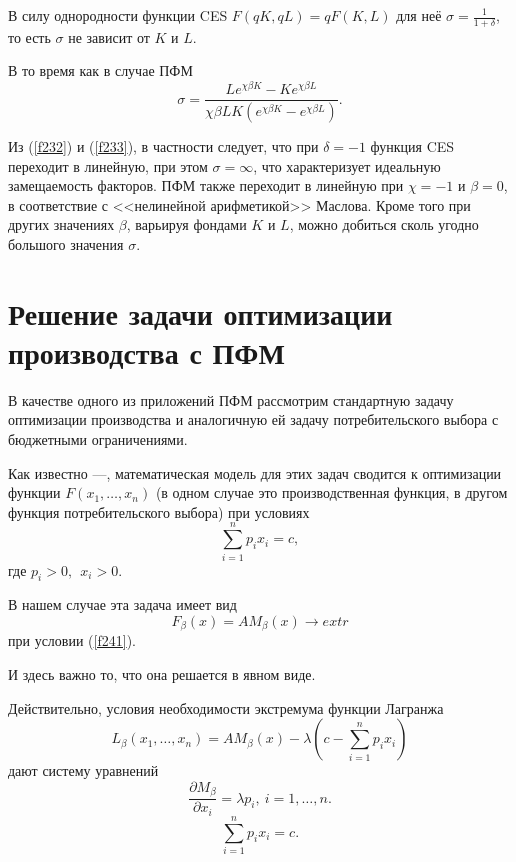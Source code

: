 \documentclass[12pt,openbib]{report}
\begin{document}
В силу однородности функции CES $F(qK,qL)=qF(K,L)$ для неё
$\sigma=\frac1{1+\delta}$, то есть $\sigma$ не зависит от $K$ и $L$.

В то время как в случае ПФМ
\begin{equation}\label{f233}
\sigma=\frac{Le^{\chi\beta K}-Ke^{\chi\beta L}}{\chi \beta
LK(e^{\chi\beta K}-e^{\chi\beta L})}.%
\end{equation}

Из (\ref{f232}) и (\ref{f233}), в частности следует, что при $\delta=-1$ функция CES
переходит в линейную, при этом $\sigma=\infty$, что характеризует
идеальную замещаемость факторов. ПФМ также переходит в линейную при
$\chi=-1$ и $\beta=0$, в соответствие с <<нелинейной арифметикой>>
Маслова. Кроме того при других значениях $\beta$, варьируя фондами
$K$ и $L$, можно добиться сколь угодно большого значения $\sigma$.

\section{Решение задачи оптимизации производства с ПФМ}


В качестве одного из приложений ПФМ рассмотрим стандартную задачу оптимизации производства и аналогичную
ей задачу потребительского выбора с бюджетными ограничениями.

Как известно \cite{Leontev}---\cite{Kolemaev}, математическая модель для этих задач сводится к оптимизации функции $F(x_1,\ldots,x_n)$
(в одном случае это производственная функция, в другом функция потребительского выбора) при условиях
\begin{equation}\label{f241}
\sum\limits^n_{i=1}p_i x_i =c, %
\end{equation}
где $p_i>0, \ \ x_i>0$.

В нашем случае эта задача имеет вид
\begin{equation}\label{f242}
F_\beta(x)=A M_\beta(x)\rightarrow extr %
\end{equation}
при условии (\ref{f241}).

И здесь важно то, что она решается в явном виде.

Действительно, условия необходимости экстремума функции Лагранжа
$$
L_\beta (x_1,\ldots,x_n)=A M_\beta(x)-\lambda(c-\sum\limits_{i=1}^n p_i x_i)$$
дают систему уравнений
\begin{equation}\label{f243}
\frac{\partial M_\beta}{\partial x_i}=\lambda p_i, \ i=1,\ldots,n. %
\end{equation}
$$
\sum\limits^n_{i=1} p_i x_i =c.
$$
\end{document}
